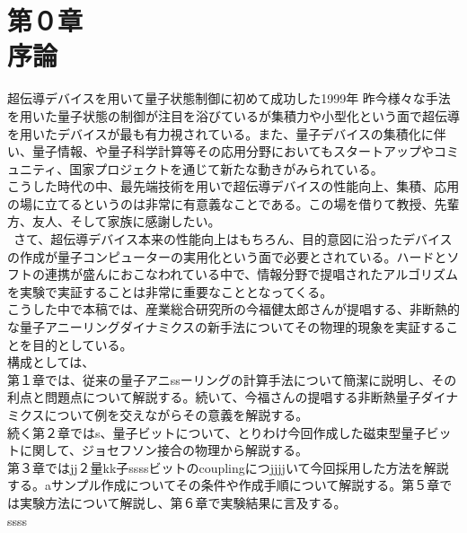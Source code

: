 \chapter{第０章\\序論}
超伝導デバイスを用いて量子状態制御に初めて成功した1999年
昨今様々な手法を用いた量子状態の制御が注目を浴びているが集積力や小型化という面で超伝導を用いたデバイスが最も有力視されている。また、量子デバイスの集積化に伴い、量子情報、や量子科学計算等その応用分野においてもスタートアップやコミュニティ、国家プロジェクトを通じて新たな動きがみられている。\\
こうした時代の中、最先端技術を用いで超伝導デバイスの性能向上、集積、応用の場に立てるというのは非常に有意義なことである。この場を借りて教授、先輩方、友人、そして家族に感謝したい。\\
\ さて、超伝導デバイス本来の性能向上はもちろん、目的意図に沿ったデバイスの作成が量子コンピューターの実用化という面で必要とされている。ハードとソフトの連携が盛んにおこなわれている中で、情報分野で提唱されたアルゴリズムを実験で実証することは非常に重要なこととなってくる。\\
こうした中で本稿では、産業総合研究所の今福健太郎さんが提唱する、非断熱的な量子アニーリングダイナミクスの新手法についてその物理的現象を実証することを目的としている。\\
構成としては、\\
第１章では、従来の量子アニssーリングの計算手法について簡潔に説明し、その利点と問題点について解説する。続いて、今福さんの提唱する非断熱量子ダイナミクスについて例を交えながらその意義を解説する。\\
続く第２章ではs、量子ビットについて、とりわけ今回作成した磁束型量子ビットに関して、ジョセフソン接合の物理から解説する。\\
第３章ではjj２量kk子ssssビットのcouplingにつjjjjいて今回採用した方法を解説する。aサンプル作成についてその条件や作成手順について解説する。第５章では実験方法について解説し、第６章で実験結果に言及する。\\
ssss\\